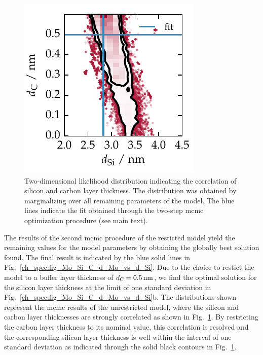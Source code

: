 \begin{figure}[htbp]
\centering
\includegraphics{img/Mo_Si_C_correlation_Si_C}
\caption{Two-dimensional likelihood distribution indicating the correlation of silicon and carbon layer thickness. The distribution was obtained by marginalizing over all remaining parameters of the model. The blue lines indicate the fit obtained through the two-step \gls{mcmc} optimization procedure (see main text).}
\label{ch_spec:fig_Mo_Si_C_correlation_Si_C}
\end{figure}
The results of the second \gls{mcmc} procedure of the resticted model yield the remaining values for the model parameters by obtaining the globally best solution found. The final result is indicated by the blue solid lines in Fig.~\ref{ch_spec:fig_Mo_Si_C_d_Mo_vs_d_Si}. Due to the choice to restict the model to a buffer layer thickness of $d_\text{C} = \nm{0.5}$, we find the optimal solution for the silicon layer thickness at the limit of one standard deviation in Fig.~\ref{ch_spec:fig_Mo_Si_C_d_Mo_vs_d_Si}b. The distributions shown represent the \gls{mcmc} results of the unrestricted model, where the silicon and carbon layer thicknesses are strongly correlated as shown in Fig.~\ref{ch_spec:fig_Mo_Si_C_correlation_Si_C}. By restricting the carbon layer thickness to its nominal value, this correlation is resolved and the corresponding silicon layer thickness is well within the interval of one standard deviation as indicated through the solid black contours in Fig.~\ref{ch_spec:fig_Mo_Si_C_correlation_Si_C}.

